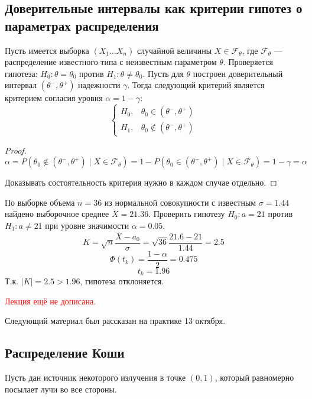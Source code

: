 \subsection{Доверительные интервалы как критерии гипотез о параметрах распределения}

Пусть имеется выборка \((X_1 \dots X_n)\) случайной величины \(X \in \mathcal{F}_\theta\), где \(\mathcal{F}_\theta\) --- распределение известного типа с неизвестным параметром \(\theta\). Проверяется гипотеза: \(H_0 : \theta = \theta_0\) против \(H_1 : \theta \neq \theta_0\). Пусть для \(\theta\) построен доверительный интервал \((\theta^- , \theta^+)\) надежности \(\gamma\). Тогда следующий критерий является критерием согласия уровня \(\alpha = 1 - \gamma\):
\[\begin{cases}
        H_0, & \theta_0 \in (\theta^- , \theta^+)    \\
        H_1, & \theta_0 \notin (\theta^- , \theta^+)
    \end{cases}\]
\begin{proof}
    \[\alpha = P(\theta_0 \notin (\theta^- , \theta^+) \mid X \in \mathcal{F}_\theta) = 1 - P(\theta_0 \in (\theta^- , \theta^+) \mid X \in \mathcal{F}_\theta) = 1 - \gamma = \alpha\]

    Доказывать состоятельность критерия нужно в каждом случае отдельно.
\end{proof}

\begin{example}
    По выборке объема \(n = 36\) из нормальной совокупности с известным \(\sigma = 1.44\) найдено выборочное среднее \(\overline{X} = 21.36\). Проверить гипотезу \(H_0 : a = 21\) против \(H_1 : a \neq 21\) при уровне значимости \(\alpha = 0.05\).
    \[K = \sqrt{n} \frac{ \overline{X} - a_0}{\sigma} = \sqrt{36} \frac{21.6 - 21}{1.44} = 2.5\]
    \[\Phi(t_k) = \frac{1 - \alpha}{2} = 0.475\]
    \[t_k = 1.96\]
    Т.к. \(|K| = 2.5 > 1.96\), гипотеза отклоняется.
\end{example}

\textcolor{red}{Лекция ещё не дописана.}

\begin{remark}
    Следующий материал был рассказан на практике 13 октября.
\end{remark}

\subsection{Распределение Коши}

Пусть дан источник некоторого излучения в точке \((0, 1)\), который равномерно посылает лучи во все стороны.

